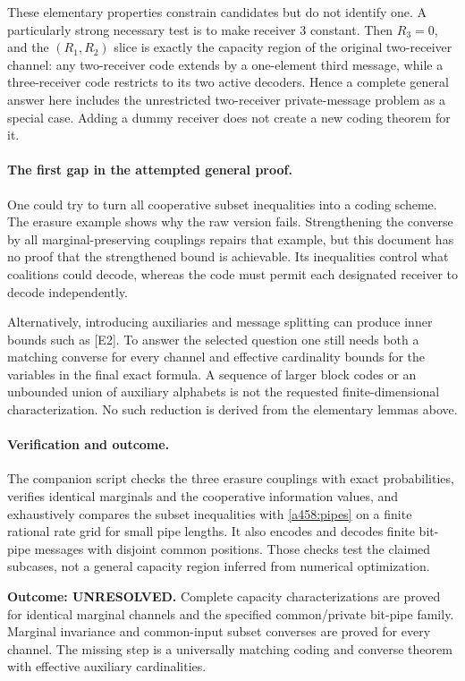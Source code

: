 \documentclass[11pt]{article}
\begin{document}
These elementary properties constrain candidates but do not identify
one. A particularly strong necessary test is to make receiver 3 constant.
Then $R_3=0$, and the $(R_1,R_2)$ slice is exactly the capacity region
of the original two-receiver channel: any two-receiver code extends by
a one-element third message, while a three-receiver code restricts to
its two active decoders. Hence a complete general answer here includes
the unrestricted two-receiver private-message problem as a special case.
Adding a dummy receiver does not create a new coding theorem for it.

\paragraph{The first gap in the attempted general proof.}
One could try to turn all cooperative subset inequalities into a coding
scheme. The erasure example shows why the raw version fails. Strengthening
the converse by all marginal-preserving couplings repairs that example,
but this document has no proof that the strengthened bound is achievable.
Its inequalities control what coalitions could decode, whereas the code
must permit each designated receiver to decode independently.

Alternatively, introducing auxiliaries and message splitting can produce
inner bounds such as [E2]. To answer the selected question one still needs
both a matching converse for every channel and effective cardinality
bounds for the variables in the final exact formula. A sequence of
larger block codes or an unbounded union of auxiliary alphabets is not
the requested finite-dimensional characterization. No such reduction
is derived from the elementary lemmas above.

\paragraph{Verification and outcome.}
The companion script checks the three erasure couplings with exact
probabilities, verifies identical marginals and the cooperative information
values, and exhaustively compares the subset inequalities with
\eqref{a458:pipes} on a finite rational rate grid for small pipe lengths.
It also encodes and decodes finite bit-pipe messages with disjoint common
positions. Those checks test the claimed subcases, not a general capacity
region inferred from numerical optimization.

\textbf{Outcome: UNRESOLVED.} Complete capacity characterizations are
proved for identical marginal channels and the specified common/private
bit-pipe family. Marginal invariance and common-input subset converses
are proved for every channel. The missing step is a universally matching
coding and converse theorem with effective auxiliary cardinalities.
\end{document}

